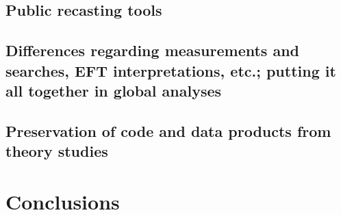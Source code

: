 \documentclass[11pt]{article}
\begin{document}
\subsection{Public recasting tools}

\subsection{Differences regarding measurements and searches, EFT interpretations, etc.; putting it all together in global analyses}

\subsection{Preservation of code and data products from theory studies}


\section{Conclusions}



\def\thefootnote{\fnsymbol{footnote}}
\setcounter{footnote}{0}
%




\end{document}
